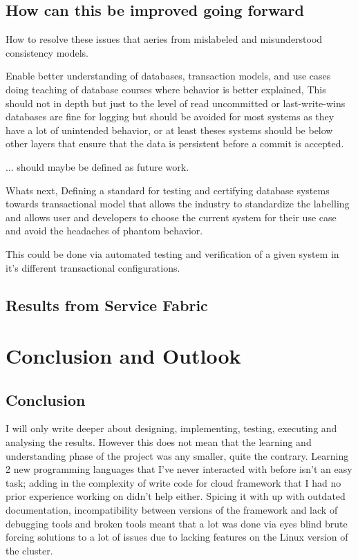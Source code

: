 \documentclass[a4paper,10pt,titlepage]{report}
\begin{document}
\section{How can this be improved going forward}


How to resolve these issues that aeries from mislabeled and misunderstood consistency models.

Enable better understanding of databases, transaction models, and use cases doing teaching of database courses where behavior is better explained, This should not in depth but just to the level of read uncommitted or last-write-wins databases are fine for logging but should be avoided for most systems as they have a lot of unintended behavior, or at least theses systems should be below other layers that ensure that the data is persistent before a commit is accepted.

... should maybe be defined as future work.

Whats next, Defining a standard for testing and certifying database systems towards transactional model that allows the industry to standardize the labelling and allows user and developers to choose the current system for their use case and avoid the headaches of phantom behavior.

This could be done via automated testing and verification of a given system in it's different transactional configurations.


\section{Results from Service Fabric}


\chapter{Conclusion and Outlook}
\section*{Conclusion}

 I will only write deeper about designing, implementing, testing, executing and analysing the results. However this does not mean that the learning and understanding phase of the project was any smaller, quite the contrary. Learning 2 new programming languages that I've never interacted with before isn't an easy task; adding in the complexity of write code for cloud framework that I had no prior experience working on didn't help either. Spicing it with up with outdated documentation, incompatibility between versions of the framework and lack of debugging tools and broken tools meant that a lot was done via eyes blind brute forcing solutions to a lot of issues due to lacking features on the Linux version of the cluster.\\
 
\end{document}
